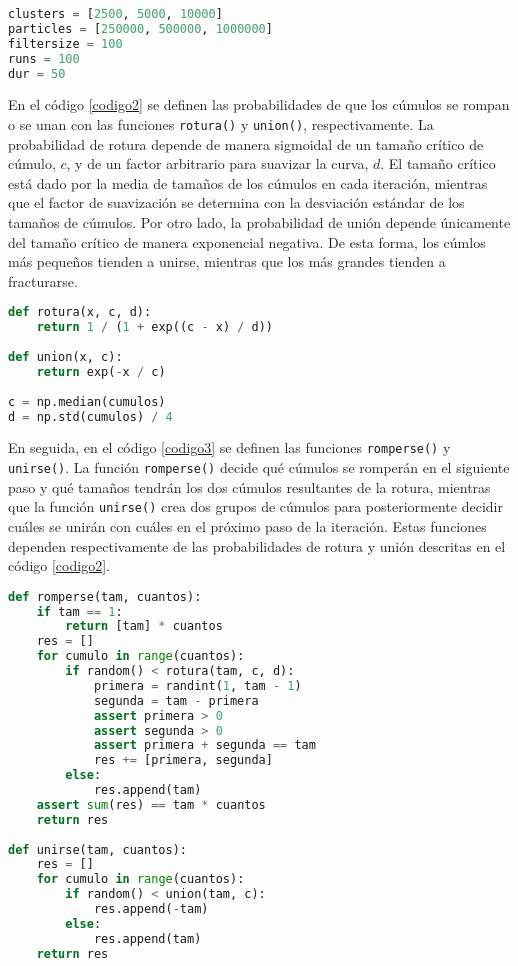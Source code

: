 \documentclass{article}
\begin{document}
\begin{lstlisting}[caption=Par\'ametros de Operaci\'on, label=codigo1, language=Python]
clusters = [2500, 5000, 10000]
particles = [250000, 500000, 1000000]
filtersize = 100
runs = 100
dur = 50
\end{lstlisting}

En el c\'odigo \ref{codigo2} se definen las probabilidades de que los c\'umulos se rompan o se unan con las funciones \texttt{rotura()} y \texttt{union()}, respectivamente. La probabilidad de rotura depende de manera sigmoidal de un tama\~no cr\'itico de c\'umulo, $c$, y de un factor arbitrario para suavizar la curva, $d$. El tama\~no cr\'itico est\'a dado por la media de tama\~nos de los c\'umulos en cada iteraci\'on, mientras que el factor de suavizaci\'on se determina con la desviaci\'on est\'andar de los tama\~nos de c\'umulos. Por otro lado, la probabilidad de uni\'on depende \'unicamente del tama\~no cr\'itico de manera exponencial negativa. De esta forma, los c\'umlos m\'as peque\~nos tienden a unirse, mientras que los m\'as grandes tienden a fracturarse.

\begin{lstlisting}[caption=Probabilidades de Rotura y Uni\'on, label=codigo2, language=Python]
def rotura(x, c, d):
    return 1 / (1 + exp((c - x) / d))
 
def union(x, c):
    return exp(-x / c)
    
c = np.median(cumulos)
d = np.std(cumulos) / 4
\end{lstlisting}

En seguida, en el c\'odigo \ref{codigo3} se definen las funciones \texttt{romperse()} y \texttt{unirse()}. La funci\'on \texttt{romperse()} decide qu\'e c\'umulos se romper\'an en el siguiente paso y qu\'e tama\~nos tendr\'an los dos c\'umulos resultantes de la rotura, mientras que la funci\'on \texttt{unirse()} crea dos grupos de c\'umulos para posteriormente decidir cu\'ales se unir\'an con cu\'ales en el pr\'oximo paso de la iteraci\'on. Estas funciones dependen respectivamente de las probabilidades de rotura y uni\'on descritas en el c\'odigo \ref{codigo2}.

\begin{lstlisting}[caption=Acciones de Rotura y Uni\'on de C\'umulos, label=codigo3, language=Python]
def romperse(tam, cuantos):
    if tam == 1:
        return [tam] * cuantos
    res = []
    for cumulo in range(cuantos):
        if random() < rotura(tam, c, d):
            primera = randint(1, tam - 1)
            segunda = tam - primera
            assert primera > 0
            assert segunda > 0
            assert primera + segunda == tam
            res += [primera, segunda]
        else:
            res.append(tam)
    assert sum(res) == tam * cuantos
    return res
 
def unirse(tam, cuantos):
    res = []
    for cumulo in range(cuantos):
        if random() < union(tam, c):
            res.append(-tam)
        else:
            res.append(tam)
    return res
\end{lstlisting}
\end{document}
